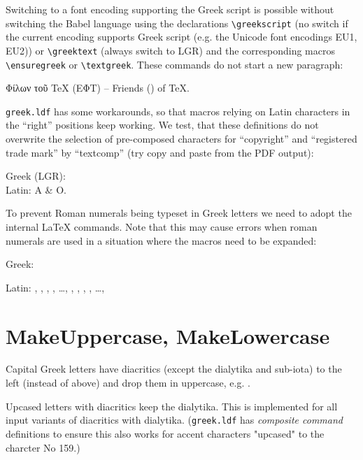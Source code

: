 \documentclass[a4paper]{article}
\begin{document}
Switching to a font encoding supporting the Greek script is possible without
switching the Babel language using the declarations \verb|\greekscript| (no
switch if the current encoding supports Greek script (e.g. the Unicode font
encodings EU1, EU2)) or \verb|\greektext| (always switch to LGR) and the
corresponding macros \verb|\ensuregreek| or \verb|\textgreek|. These
commands do not start a new paragraph:

\greekscript Φίλων τοῦ \textlatin{TeX} (ΕΦΤ) --
\latintext Friends () of TeX.

\texttt{greek.ldf} has some workarounds, so that macros relying on Latin
characters in the ``right'' positions keep working. We test, that these
definitions do not overwrite the selection of pre-composed characters for
``copyright'' and ``registered trade mark'' by ``textcomp'' (try copy and
paste from the PDF output):

Greek (LGR):  \\
Latin: A \& O.

To prevent Roman numerals being typeset in Greek letters we need to adopt
the internal LaTeX commands. Note that this may cause errors when roman
numerals are used in a situation where the macros need to be expanded:

\makeatletter
Greek: 

Latin:
, , , , \ldots, 
, , , , \ldots, 
\makeatother

\section{MakeUppercase, MakeLowercase}

Capital Greek letters have diacritics (except the dialytika and sub-iota) to
the left (instead of above) and drop them in uppercase, e.g.
.

Upcased letters with diacritics keep the dialytika. This is implemented for
all input variants of diacritics with dialytika. (\texttt{greek.ldf} has
\emph{composite command} definitions to ensure this also works for accent
characters "upcased" to the charcter No 159.)
\end{document}
